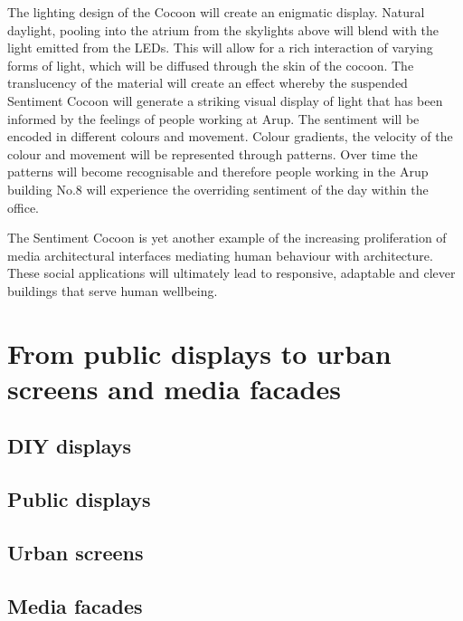 The lighting design of the Cocoon will create an enigmatic display. Natural daylight, pooling into the atrium from the skylights above will blend with the light emitted from the LEDs. This will allow for a rich interaction of varying forms of light, which will be diffused through the skin of the cocoon. The translucency of the material will create an effect whereby the suspended Sentiment Cocoon will generate a striking visual display of light that has been informed by the feelings of people working at Arup.
The sentiment will be encoded in different colours and movement. Colour gradients, the velocity of the colour and movement will be represented through patterns. Over time the patterns will become recognisable and therefore people working in the Arup building No.8 will experience the overriding sentiment of the day within the office.

The Sentiment Cocoon is yet another example of the increasing proliferation of media architectural interfaces mediating human behaviour with architecture. These social applications will ultimately lead to responsive, adaptable and clever buildings that serve human wellbeing. 

\section{From public displays to urban screens and media facades}

\blindtext

\subsection{DIY displays}

\blindtext

\subsection{Public displays}

\blindtext

\subsection{Urban screens}

\blindtext

\subsection{Media facades}

\blindtext

